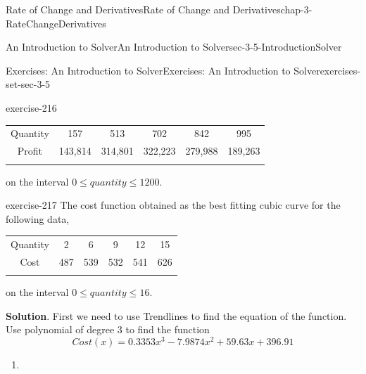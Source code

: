 \documentclass[oneside,10pt,]{book}
\numberwithin{equation}{section}
\newcommand{\hrulethin}  {\noalign{\hrule height 0.04em}}
\newcommand{\hrulethick} {\noalign{\hrule height 0.11em}}
\begin{document}
\begin{chapterptx}{Rate of Change and Derivatives}{}{Rate of Change and Derivatives}{}{}{chap-3-RateChangeDerivatives}
\begin{sectionptx}{An Introduction to Solver}{}{An Introduction to Solver}{}{}{sec-3-5-IntroductionSolver}
\begin{exercises-subsection-numberless}{Exercises: An Introduction to Solver}{}{Exercises: An Introduction to Solver}{}{}{exercises-set-sec-3-5}
\begin{divisionexercise}{6}{}{}{exercise-216}
\begin{sidebyside}{1}{0}{0}{0}
\begin{sbspanel}{1}
{\begin{tabular}{cccccc}
Quantity&157&513&702&842&995\tabularnewline\hrulethin
Profit&143,814&314,801&322,223&279,988&189,263\tabularnewline\hrulethin
\end{tabular}
\par}
\end{sbspanel}%
\end{sidebyside}%
\par
\hypertarget{p-1391}{}%
on the interval \(0\le quantity\le 1200\).%
\end{divisionexercise}%
\begin{divisionexercise}{7}{}{}{exercise-217}%
\hypertarget{p-1392}{}%
The cost function obtained as the best fitting cubic curve for the following data,%
\begin{sidebyside}{1}{0}{0}{0}%
\begin{sbspanel}{1}%
{\centering%
\begin{tabular}{cccccc}\hrulethick
Quantity&2&6&9&12&15\tabularnewline\hrulethin
Cost&487&539&532&541&626\tabularnewline\hrulethin
\end{tabular}
\par}
\end{sbspanel}%
\end{sidebyside}%
\par
\hypertarget{p-1393}{}%
on the interval \(0\le quantity\le 16\).%
\par\smallskip%
\noindent\textbf{Solution}.\hypertarget{solution-108}{}\quad%
\hypertarget{p-1394}{}%
First we need to use Trendlines to find the equation of the function. Use polynomial of degree 3 to find the function%
%
\begin{equation*}
Cost(x)= 0.3353x^3  - 7.9874x^2  + 59.63x + 396.91
\end{equation*}
\leavevmode%
\begin{enumerate}[label=(\alph*)]
\item\hypertarget{li-437}{}\leavevmode%
\begin{sidebyside}{1}{0.15}{0.15}{0}%
\begin{sbspanel}{0.7}%

\end{sbspanel}
\end{sidebyside}
\end{enumerate}
\end{divisionexercise}
\end{exercises-subsection-numberless}
\end{sectionptx}
\end{chapterptx}
\end{document}
